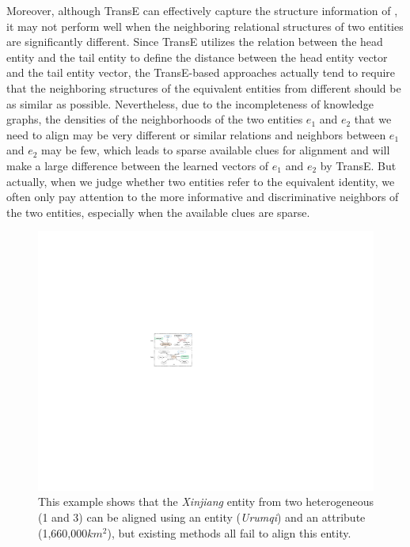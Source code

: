 	Moreover, although TransE can effectively capture the structure information of \KGs, it may not perform well when the neighboring relational structures of two entities are significantly different. Since TransE utilizes the relation between the head entity and the tail entity to define the distance between the head entity vector and the tail entity vector, the TransE-based approaches actually tend to require that the neighboring structures of the equivalent entities from different \KGs should be as similar as possible. Nevertheless, due to the incompleteness of knowledge graphs, the densities of the neighborhoods of the two entities $e_1$ and $e_2$ that we need to align may be very different or similar relations and neighbors between $e_1$ and $e_2$ may be few, which leads to sparse available clues for alignment and will make a large difference between the learned vectors of $e_1$ and $e_2$ by TransE. But actually, when we judge whether two entities refer to the equivalent identity, we often only pay attention to the more informative and discriminative neighbors of the two entities, especially when the available clues are sparse.
	\begin{figure}
		\centering
			\includegraphics[width=1\linewidth]{figures/graph1.pdf}
			\caption{This example shows that the \emph{Xinjiang} entity from two heterogeneous \KGs (1 and 3) can be aligned using an entity (\emph{Urumqi}) and an attribute (1,660,000$km^2$), but existing methods all fail to align this entity.}
			\label{Xinjiang}
	\end{figure}
